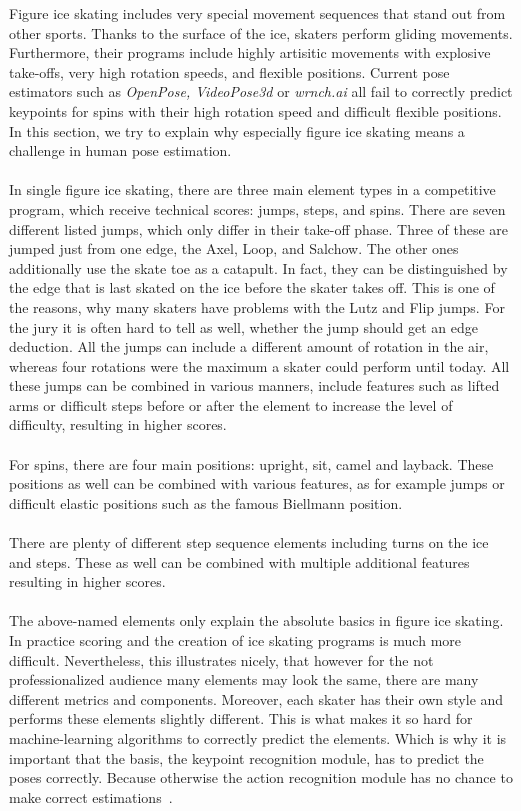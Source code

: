 Figure ice skating includes very special movement sequences that stand out from other sports.
Thanks to the surface of the ice, skaters perform gliding movements.
Furthermore, their programs include highly artisitic
movements with explosive take-offs, very high rotation speeds, and flexible positions.
Current pose estimators such as \textit{OpenPose, VideoPose3d} or \textit{wrnch.ai} all fail to correctly predict keypoints
for spins with their high
rotation speed and difficult flexible positions.
In this section, we try to explain why especially figure ice skating means a challenge in human pose estimation.
\\\mbox{}\\
In single figure ice skating, there are three main element types in a competitive program, which receive
technical scores:
jumps, steps, and spins.
There are seven different listed jumps, which only differ in their take-off phase.
Three
of these
are jumped just from one edge, the Axel, Loop, and Salchow.
The other ones additionally use the skate toe as a catapult.
In fact, they can be distinguished by the edge that is last skated on the ice before the skater takes off.
This is one of the reasons, why many skaters have problems with the Lutz and Flip jumps.
For the jury it is often hard to tell as well, whether the jump should get an edge deduction.
All the jumps can include a different amount of rotation in the air,
whereas four rotations were the maximum a skater could perform until today.
All these jumps can be combined in various manners, include features such as lifted arms or difficult steps
before or after the element to
increase the level of difficulty, resulting in higher scores.
\\\mbox{}\\
For spins, there are four main positions: upright, sit, camel and layback.
These positions as well can be combined with various features, as for example jumps or difficult elastic positions
such as the famous Biellmann position.
\\\mbox{}\\
There are plenty of different step sequence elements including turns on the ice and steps.
These as well can be combined with multiple additional features resulting in higher scores.
\\\mbox{}\\
The above-named elements only explain the absolute basics in figure ice skating.
In practice scoring and the
creation of ice skating
programs is much more difficult.
Nevertheless, this illustrates nicely, that however for the not professionalized
audience many elements may
look the same, there are many different metrics and components.
Moreover, each skater has their own style
and performs these elements
slightly different.
This is what makes it so hard for machine-learning algorithms to correctly predict the elements.
Which is
why it is important that
the basis, the keypoint recognition module, has to predict the poses correctly.
Because otherwise the action
recognition module has no
chance to make correct estimations~\cite{isuguideleinesgoe, isujudginssystem}.

